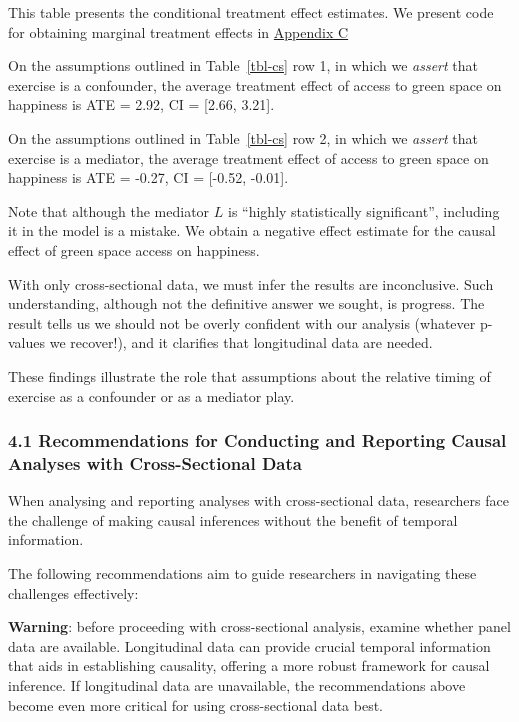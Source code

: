 \documentclass[
  single column]{article}
\begin{document}
This table presents the conditional treatment effect estimates. We
present code for obtaining marginal treatment effects in
\hyperref[appendix-c]{Appendix C}

On the assumptions outlined in Table~\ref{tbl-cs} row 1, in which we
\emph{assert} that exercise is a confounder, the average treatment
effect of access to green space on happiness is ATE = 2.92, CI =
{[}2.66, 3.21{]}.

On the assumptions outlined in Table~\ref{tbl-cs} row 2, in which we
\emph{assert} that exercise is a mediator, the average treatment effect
of access to green space on happiness is ATE = -0.27, CI = {[}-0.52,
-0.01{]}.

Note that although the mediator \(L\) is ``highly statistically
significant'', including it in the model is a mistake. We obtain a
negative effect estimate for the causal effect of green space access on
happiness.

With only cross-sectional data, we must infer the results are
inconclusive. Such understanding, although not the definitive answer we
sought, is progress. The result tells us we should not be overly
confident with our analysis (whatever p-values we recover!), and it
clarifies that longitudinal data are needed.

These findings illustrate the role that assumptions about the relative
timing of exercise as a confounder or as a mediator play.

\subsubsection{4.1 Recommendations for Conducting and Reporting Causal
Analyses with Cross-Sectional
Data}\label{recommendations-for-conducting-and-reporting-causal-analyses-with-cross-sectional-data}

When analysing and reporting analyses with cross-sectional data,
researchers face the challenge of making causal inferences without the
benefit of temporal information.

The following recommendations aim to guide researchers in navigating
these challenges effectively:

\textbf{Warning}: before proceeding with cross-sectional analysis,
examine whether panel data are available. Longitudinal data can provide
crucial temporal information that aids in establishing causality,
offering a more robust framework for causal inference. If longitudinal
data are unavailable, the recommendations above become even more
critical for using cross-sectional data best.
\end{document}
